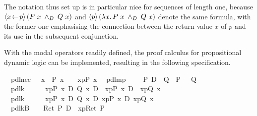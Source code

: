 The notation thus set up is in particular nice for sequences of length one,
because $\PDLDmd{x\leteq p}{({P\ x}\; \land_D\; {Q\ x})}$ and
$\PDLDmd{p}{(\LambdaTerm{x}{{P\ x}\; \land_D\; {Q\ x}})}$ denote the same formula,
with the former one emphasising the connection between the return value $x$ of
$p$ and its use in the subsequent conjunction.

With the modal operators readily defined, the proof calculus for propositional
dynamic logic can be implemented,
resulting in the following specification.
\begin{isabellebody}
\isanewline
{}\isanewline
\ \ pdl{\isacharunderscore}nec{\isacharcolon}\ \ \ {\isachardoublequote}{\isacharparenleft}{\isasymforall}x{\isachardot}\ {\isasymturnstile}\ P\ x{\isacharparenright}\ {\isasymLongrightarrow}\ {\isasymturnstile}\ {\isacharbrackleft}{\isacharhash}\ x{\isasymleftarrow}p{\isacharbrackright}{\isacharparenleft}P\ x{\isacharparenright}{\isachardoublequote}\isanewline
\ \ pdl{\isacharunderscore}mp{\isacharunderscore}{\isacharcolon}\ \ \ \ {\isachardoublequote}{\isasymlbrakk}{\isasymturnstile}\ {\isacharparenleft}P\ {\isasymlongrightarrow}\isactrlsub D\ \ Q{\isacharparenright}{\isacharsemicolon}\ {\isasymturnstile}\ P{\isasymrbrakk}\ {\isasymLongrightarrow}\ {\isasymturnstile}\ Q{\isachardoublequote}
\isanewline
\ \isanewline
\ \ pdl{\isacharunderscore}k{}{\isacharcolon}\ \ \ \ {\isachardoublequote}{\isasymturnstile}\ {\isacharbrackleft}{\isacharhash}\ x{\isasymleftarrow}p{\isacharbrackright}{\isacharparenleft}P\ x\ {\isasymlongrightarrow}\isactrlsub D\ Q\ x{\isacharparenright}\ {\isasymlongrightarrow}\isactrlsub D\ {\isacharbrackleft}{\isacharhash}\ x{\isasymleftarrow}p{\isacharbrackright}{\isacharparenleft}P\ x{\isacharparenright}\ {\isasymlongrightarrow}\isactrlsub D\ {\isacharbrackleft}{\isacharhash}\ x{\isasymleftarrow}p{\isacharbrackright}{\isacharparenleft}Q\ x{\isacharparenright}{\isachardoublequote}\isanewline
\ \ pdl{\isacharunderscore}k{}{\isacharcolon}\ \ \ \ {\isachardoublequote}{\isasymturnstile}\ {\isacharbrackleft}{\isacharhash}\ x{\isasymleftarrow}p{\isacharbrackright}{\isacharparenleft}P\ x\ {\isasymlongrightarrow}\isactrlsub D\ Q\ x{\isacharparenright}\ {\isasymlongrightarrow}\isactrlsub D\ {\isasymlangle}x{\isasymleftarrow}p{\isasymrangle}{\isacharparenleft}P\ x{\isacharparenright}\ {\isasymlongrightarrow}\isactrlsub D\ {\isasymlangle}x{\isasymleftarrow}p{\isasymrangle}{\isacharparenleft}Q\ x{\isacharparenright}{\isachardoublequote}\isanewline
\ \ pdl{\isacharunderscore}k{}B{\isacharcolon}\ \ \ {\isachardoublequote}{\isasymturnstile}\ Ret\ P\ {\isasymlongrightarrow}\isactrlsub D\ {\isacharbrackleft}{\isacharhash}\ x{\isasymleftarrow}p{\isacharbrackright}{\isacharparenleft}Ret\ P{\isacharparenright}{\isachardoublequote}\isanewline

\end{isabellebody}
